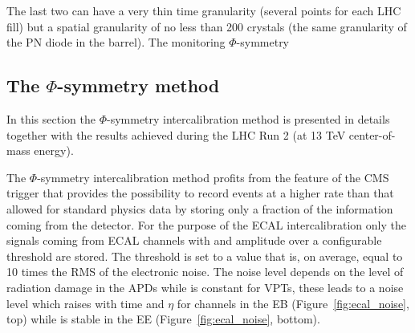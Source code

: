 The last two can have a very thin time granularity (several points for each LHC fill) but a spatial granularity of no less
than 200 crystals (the same granularity of the PN diode in the barrel). The monitoring $\Phi$-symmetry

\subsection{The $\Phi$-symmetry method}
\label{sec:phisym}
In this section the $\Phi $-symmetry intercalibration method is presented in details together with the results achieved
during the LHC Run 2 (at 13 TeV center-of-mass energy).

The $\Phi$-symmetry intercalibration method profits from the feature of the CMS trigger that provides the possibility
to record events at a higher rate than that allowed for standard physics data by storing only a fraction of the information
coming from the detector. For the purpose of the ECAL intercalibration only the signals coming from ECAL channels with
and amplitude over a configurable threshold are stored.
The threshold is set to a value that is, on average, equal to 10 times the RMS of the electronic noise.
The noise level depends on the level of radiation damage in the APDs while is constant for VPTs, these leads
to a noise level which raises with time and $\eta$ for channels in the EB (Figure~\ref{fig:ecal_noise}, top)
while is stable in the EE (Figure~\ref{fig:ecal_noise}, bottom).

